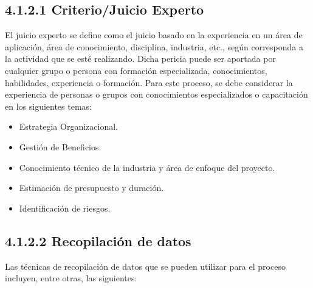 \documentclass[letterpaper,12pt,openright,oneside]{article}
\theoremstyle{plain}
\begin{document}
\subsection*{4.1.2.1 Criterio/Juicio Experto}

El juicio experto se define como el juicio basado en la experiencia en un área de aplicación, área de conocimiento, disciplina, industria, etc., según corresponda a la actividad que se esté realizando. Dicha pericia puede ser aportada por cualquier grupo o persona con formación especializada, conocimientos, habilidades, experiencia o formación.
Para este proceso, se debe considerar la experiencia de personas o grupos con conocimientos especializados o capacitación en los siguientes temas:

\begin{itemize}
    \item Estrategia Organizacional.
    \item Gestión de Beneficios.
    \item Conocimiento técnico de la industria y área de enfoque del proyecto.
    \item Estimación de presupuesto y duración.
    \item Identificación de riesgos.
\end{itemize}
% 
% 
\subsection*{4.1.2.2 Recopilación de datos}

Las técnicas de recopilación de datos que se pueden utilizar para el proceso incluyen, entre otras, las siguientes:
\end{document}
